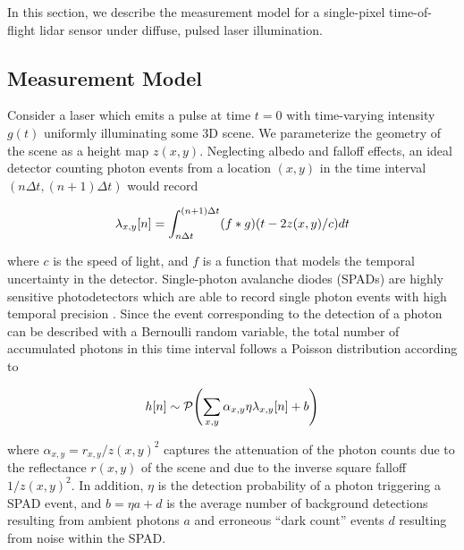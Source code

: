 In this section, we describe the measurement model for a single-pixel
time-of-flight lidar sensor under diffuse, pulsed laser illumination. 
\subsection{Measurement Model}
Consider a laser which emits a pulse at time $t = 0$ with time-varying intensity
$g(t)$ uniformly illuminating some 3D scene. We parameterize the geometry of the
scene as a height map $z(x, y)$.
Neglecting albedo and falloff effects, an ideal detector counting photon events
from a location $(x,y)$ in the time interval $(n\Delta t, (n+1) \Delta t)$ would record

\begin{equation}
  \lambda_{x,y}[n] = \int_{n\Delta t}^{(n+1) \Delta t} (f * g)\paren*{t - 2z(x,y)/c} dt \label{single_loc_spad} 
\end{equation}  

where $c$ is the speed of light, and $f$ is a function that models the temporal uncertainty in the
detector. Single-photon avalanche diodes (SPADs) are highly sensitive
photodetectors which are able to record single photon events with high temporal
precision \cite{Stuff}. Since the event corresponding to the detection of a
photon can be described with a Bernoulli random variable,
the total number of accumulated photons in this time interval follows a Poisson
distribution according to

\begin{equation}
  h[n] \sim \mathcal{P}\paren*{\sum_{x,y}\alpha_{x,y}\eta \lambda_{x,y}[n] + b} \label{global_hints}
\end{equation}

where $\alpha_{x,y} = r_{x,y}/z(x,y)^2$ captures the attenuation of the
photon counts due to the reflectance $r(x,y)$ of the scene and due to the
inverse square falloff $1/z(x,y)^2$.
In addition, $\eta$ is the detection probability of a photon
triggering a SPAD event, and $b = \eta a + d$ is the average number of background detections resulting
from ambient photons $a$
and erroneous ``dark count'' events $d$ resulting from noise within the SPAD.

